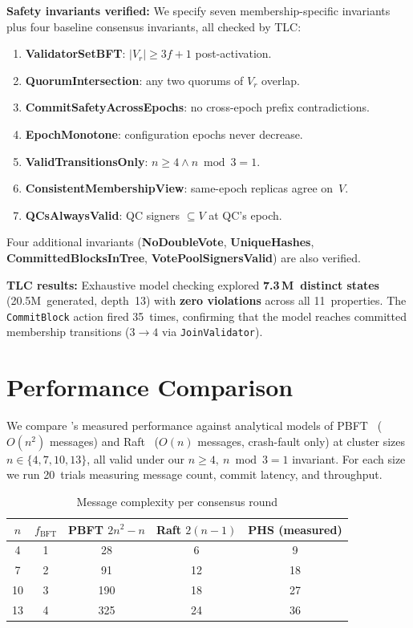 \smallskip\noindent\textbf{Safety invariants verified:}\quad
We specify seven membership-specific invariants plus four baseline consensus invariants, all
checked by TLC:

\begin{enumerate}[label=\textbf{\arabic*},leftmargin=*,nosep]
  \item \textbf{ValidatorSetBFT}: $|V_r| \ge 3f{+}1$ post-activation.
  \item \textbf{QuorumIntersection}: any two quorums of $V_r$ overlap.
  \item \textbf{CommitSafetyAcrossEpochs}: no cross-epoch prefix contradictions.
  \item \textbf{EpochMonotone}: configuration epochs never decrease.
  \item \textbf{ValidTransitionsOnly}: $n \ge 4 \wedge n \bmod 3 = 1$.
  \item \textbf{ConsistentMembershipView}: same-epoch replicas agree on~$V$.
  \item \textbf{QCsAlwaysValid}: QC signers $\subseteq V$ at QC's epoch.
\end{enumerate}

\noindent Four additional invariants (\textbf{NoDoubleVote}, \textbf{UniqueHashes},
\textbf{CommittedBlocksInTree}, \textbf{VotePoolSignersValid}) are also verified.

\smallskip\noindent\textbf{TLC results:}\quad
Exhaustive model checking explored \textbf{7.3\,M~distinct states} (20.5M~generated,
depth~13) with \textbf{zero violations} across all 11~properties.  The
\texttt{CommitBlock} action fired 35~times, confirming that the model reaches committed
membership transitions ($3 \to 4$ via \texttt{JoinValidator}).

\section{Performance Comparison}
\label{sec:performance}

We compare \persisthotstuff{}'s measured performance against analytical models of
PBFT~\cite{pbft1999} ($O(n^2)$ messages) and Raft~\cite{raft2014} ($O(n)$ messages,
crash-fault only) at cluster sizes $n \in \{4, 7, 10, 13\}$, all valid under our
$n \ge 4,\ n \bmod 3 = 1$ invariant.  For each size we run 20~trials measuring message
count, commit latency, and throughput.

\begin{table}[t]
\caption{Message complexity per consensus round}
\centering
\begin{tabular}{ccccc}
\toprule
$n$ & $f_{\text{BFT}}$ & \textbf{PBFT} $2n^2{-}n$
  & \textbf{Raft} $2(n{-}1)$ & \textbf{PHS} (measured) \\
\midrule
 4 & 1 &  28 &  6 &  9 \\
 7 & 2 &  91 & 12 & 18 \\
10 & 3 & 190 & 18 & 27 \\
13 & 4 & 325 & 24 & 36 \\
\bottomrule
\end{tabular}
\label{tab:messages}
\end{table}

